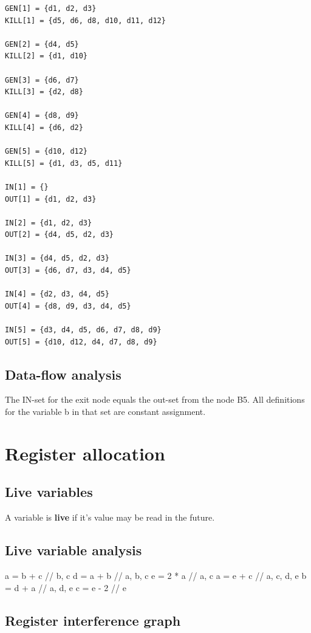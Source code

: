 \documentclass[paper=a4, fontsize=11pt]{scrartcl} %
\numberwithin{equation}{section} %
\numberwithin{figure}{section} %
\numberwithin{table}{section} %
\begin{document}
\begin{lstlisting}
GEN[1] = {d1, d2, d3}
KILL[1] = {d5, d6, d8, d10, d11, d12}

GEN[2] = {d4, d5}
KILL[2] = {d1, d10}

GEN[3] = {d6, d7}
KILL[3] = {d2, d8}

GEN[4] = {d8, d9}
KILL[4] = {d6, d2}

GEN[5] = {d10, d12}
KILL[5] = {d1, d3, d5, d11}

IN[1] = {}
OUT[1] = {d1, d2, d3}

IN[2] = {d1, d2, d3}
OUT[2] = {d4, d5, d2, d3}

IN[3] = {d4, d5, d2, d3}
OUT[3] = {d6, d7, d3, d4, d5}

IN[4] = {d2, d3, d4, d5}
OUT[4] = {d8, d9, d3, d4, d5}

IN[5] = {d3, d4, d5, d6, d7, d8, d9}
OUT[5] = {d10, d12, d4, d7, d8, d9}
\end{lstlisting}

\subsection{Data-flow analysis}

The IN-set for the exit node equals the out-set from the node B5.
All definitions for the variable b in that set are constant assignment.

\section{Register allocation}

\subsection{Live variables}
A variable is \textbf{live} if it's value may be read in the future.

\subsection{Live variable analysis}

\begin{code}
a = b + c // {b, c}
d = a + b // {a, b, c}
e = 2 * a // {a, c}
a = e + c // {a, c, d, e}
b = d + a // {a, d, e}
c = e - 2 // {e}
\end{code}

\subsection{Register interference graph}
\end{document}
